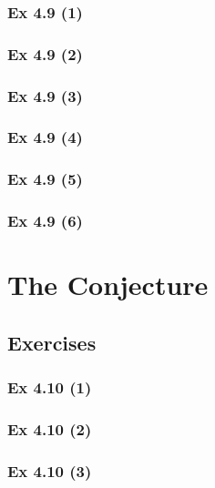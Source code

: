 \subsubsection{Ex 4.9 (1)}\label{sec:Ex_4.9.1}

\subsubsection{Ex 4.9 (2)}\label{sec:Ex_4.9.2}

\subsubsection{Ex 4.9 (3)}\label{sec:Ex_4.9.3}

\subsubsection{Ex 4.9 (4)}\label{sec:Ex_4.9.4}

\subsubsection{Ex 4.9 (5)}\label{sec:Ex_4.9.5}

\subsubsection{Ex 4.9 (6)}\label{sec:Ex_4.9.6}

\newpage		%

\section{The  Conjecture}\label{sec:4.10}
\subsection{Exercises}\label{sec:4.10_Exercises}

\subsubsection{Ex 4.10 (1)}\label{sec:Ex_4.10.1}

\subsubsection{Ex 4.10 (2)}\label{sec:Ex_4.10.2}

\subsubsection{Ex 4.10 (3)}\label{sec:Ex_4.10.3}

